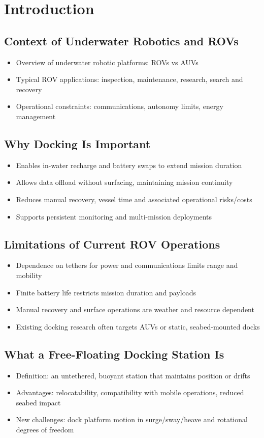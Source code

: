 \section{Introduction}

\subsection{Context of Underwater Robotics and ROVs}
\begin{itemize}
	\item Overview of underwater robotic platforms: ROVs vs AUVs
	\item Typical ROV applications: inspection, maintenance, research, search and recovery
	\item Operational constraints: communications, autonomy limits, energy management
\end{itemize}

\subsection{Why Docking Is Important}
\begin{itemize}
	\item Enables in-water recharge and battery swaps to extend mission duration
	\item Allows data offload without surfacing, maintaining mission continuity
	\item Reduces manual recovery, vessel time and associated operational risks/costs
	\item Supports persistent monitoring and multi-mission deployments
\end{itemize}

\subsection{Limitations of Current ROV Operations}
\begin{itemize}
	\item Dependence on tethers for power and communications limits range and mobility
	\item Finite battery life restricts mission duration and payloads
	\item Manual recovery and surface operations are weather and resource dependent
	\item Existing docking research often targets AUVs or static, seabed-mounted docks
\end{itemize}

\subsection{What a Free-Floating Docking Station Is}
\begin{itemize}
	\item Definition: an untethered, buoyant station that maintains position or drifts
	\item Advantages: relocatability, compatibility with mobile operations, reduced seabed impact
	\item New challenges: dock platform motion in surge/sway/heave and rotational degrees of freedom
\end{itemize}

